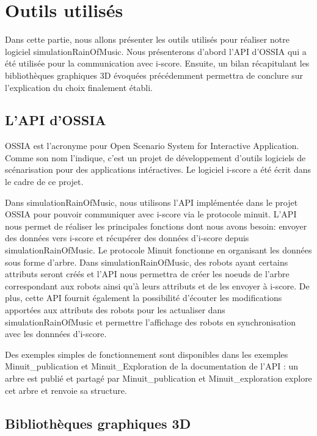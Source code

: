 \section{Outils utilisés}

Dans cette partie, nous allons présenter les outils utilisés pour réaliser notre logiciel simulationRainOfMusic. Nous présenterons d'abord l'API d'OSSIA qui a été utilisée pour la communication avec i-score. Ensuite, un bilan récapitulant les bibliothèques graphiques 3D évoquées précédemment permettra de conclure sur l'explication du choix finalement établi.

\subsection{L'API d'OSSIA}

OSSIA est l'acronyme pour Open Scenario System for Interactive Application. Comme son nom l'indique, c'est un projet de développement d'outils logiciels de scénarisation pour des applications intéractives. Le logiciel i-score a été écrit dans le cadre de ce projet. 

Dans simulationRainOfMusic, nous utilisons l'API implémentée dans le projet OSSIA pour pouvoir communiquer avec i-score via le protocole minuit. L'API nous permet de réaliser les principales fonctions dont nous avons besoin: envoyer des données vers i-score et récupérer des données d'i-score depuis simulationRainOfMusic. Le protocole Minuit fonctionne en organisant les données sous forme d'arbre. Dans simulationRainOfMusic, des robots ayant certains attributs seront créés et l'API nous permettra de créer les noeuds de l'arbre correspondant aux robots ainsi qu'à leurs attributs et de les envoyer à i-score. De plus, cette API fournit également la possibilité d'écouter les modifications apportées aux attributs des robots pour les actualiser dans simulationRainOfMusic et permettre l'affichage des robots en synchronisation avec les donnnées d'i-score. 

Des exemples simples de fonctionnement sont disponibles dans les exemples Minuit\_publication et Minuit\_Exploration de la documentation de l'API : un arbre est publié et partagé par Minuit\_publication et Minuit\_exploration explore cet arbre et renvoie sa structure.

\subsection{Bibliothèques graphiques 3D}


